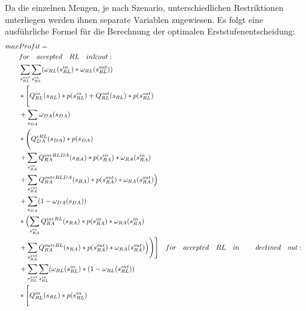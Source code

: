 \documentclass{article}
\begin{document}
Da die einzelnen Mengen, je nach Szenario, unterschiedlichen Restriktionen unterliegen werden ihnen separate Variablen zugewiesen.
Es folgt eine ausführliche Formel für die Berechnung der optimalen Erststufenentscheidung:
\begin{alignat*}{3}  
        max &Profit  =\\
			&for\quad accepted\quad RL\quad in \& out:\\
        	&\sum_{s^{out}_{RL}}\sum_{s^{in}_{RL}}  (\omega_{RL}(s^{in}_{RL})*\omega_{RL}(s^{out}_{RL}))\\
        	&*\Biggl[Q^{in}_{RL}(s_{RL}) * p(s^{in}_{RL}) + Q^{out}_{RL}(s_{RL}) * p(s^{out}_{RL})\\
    			& + \sum_{s_{DA}}\omega_{DA}(s_{DA}) \\
        	& * \Biggl(Q^{rRL}_{DA}(s_{DA}) * p(s_{DA}) \\
				& + \sum_{s^{in}_{RA}} Q^{inrRLDA}_{RA}(s_{RA}) * p(s^{in}_{RA}) * \omega_{RA}(s^{in}_{RA})\\
				& + \sum_{s^{out}_{RA}} Q^{outrRLDA}_{RA}(s_{RA}) * p(s^{out}_{RA}) * \omega_{RA}(s^{out}_{RA})\Bigr)\\
    			& + \sum_{s_{DA}}(1-\omega_{DA}(s_{DA})) \\
        	& * \Bigl(\sum_{s^{in}_{RA}} Q^{inrRL}_{RA}(s_{RA}) * p(s^{in}_{RA}) * \omega_{RA}(s^{in}_{RA})\\
				& + \sum_{s^{out}_{RA}} Q^{outrRL}_{RA}(s_{RA}) * p(s^{out}_{RA}) * \omega_{RA}(s^{out}_{RA})\Bigr) \Biggr) \Biggr]
	&for\quad accepted\quad RL\quad in \quad\	&\quad declined\quad out:\\
        	&+\sum_{s^{out}_{RL}}\sum_{s^{in}_{RL}} (\omega_{RL}(s^{in}_{RL})*(1-\omega_{RL}(s^{out}_{RL}))\\
        	&*\Biggl[Q^{in}_{RL}(s_{RL}) * p(s^{in}_{RL})\\
\end{alignat*}
\end{document}
